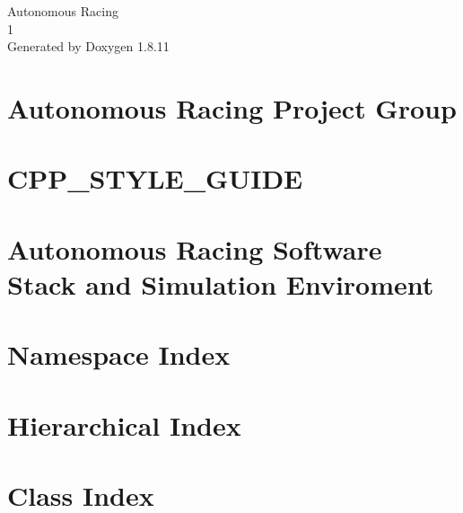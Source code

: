 \documentclass[twoside]{book}
\newcommand{\+}{\discretionary{\mbox{\scriptsize$\hookleftarrow$}}{}{}}
\newcommand{\clearemptydoublepage}{%
  \newpage{\pagestyle{empty}\cleardoublepage}%
}
\begin{document}
\hypersetup{pageanchor=false,
             bookmarksnumbered=true,
             pdfencoding=unicode
            }
\begin{titlepage}
\vspace*{7cm}
\begin{center}%
{\Large Autonomous Racing \\[1ex]\large 1 }\\
\vspace*{1cm}
{\large Generated by Doxygen 1.8.11}\\
\end{center}
\end{titlepage}
\clearemptydoublepage
\tableofcontents
\clearemptydoublepage
{}
\hypersetup{pageanchor=true}

\chapter{Autonomous Racing Project Group}
\label{index}\hypertarget{index}{}
\chapter{C\+P\+P\+\_\+\+S\+T\+Y\+L\+E\+\_\+\+G\+U\+I\+DE}
\label{md__home_travis_build_Autonomous-Racing-PG_ros.package_docs_master_CPP_STYLE_GUIDE}
\hypertarget{md__home_travis_build_Autonomous-Racing-PG_ros.package_docs_master_CPP_STYLE_GUIDE}{}

\chapter{Autonomous Racing Software Stack and Simulation Enviroment}
\label{md__home_travis_build_Autonomous-Racing-PG_ros.package_docs_master_README}
\hypertarget{md__home_travis_build_Autonomous-Racing-PG_ros.package_docs_master_README}{}

\chapter{Namespace Index}

\chapter{Hierarchical Index}

\chapter{Class Index}

\end{document}
